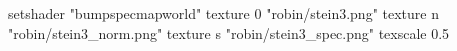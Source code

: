 setshader "bumpspecmapworld"
   texture 0 "robin/stein3.png"
   texture n "robin/stein3_norm.png"
   texture s "robin/stein3_spec.png"
texscale 0.5